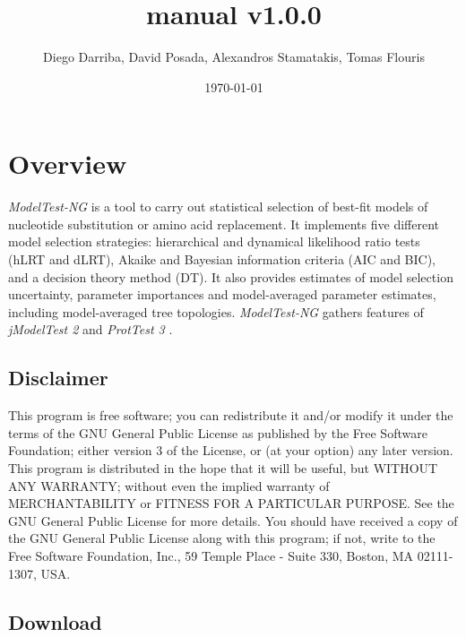 \documentclass[10pt,twoside,a4paper]{article}
\begin{document}
\providecommand{\versionnumber}{1.0.0}
\title{\normalsize manual v\versionnumber}
\author{Diego Darriba, David Posada, Alexandros Stamatakis, Tomas Flouris}
\date{\today}
\maketitle

\newcommand{\modeltest}{\emph{ModelTest-NG} }
\newcommand{\modeltestbin}{\emph{modeltest-ng} }
\newcommand{\modeltestguibin}{\emph{modeltest-gui} }

\setcounter{tocdepth}{2}
\tableofcontents

\clearpage

\section{Overview}

{\modeltest} is a tool to carry out statistical selection of best-fit models of nucleotide substitution or amino acid replacement.
It implements five different model selection strategies: hierarchical and dynamical likelihood ratio tests (hLRT and dLRT), Akaike and Bayesian information criteria (AIC and BIC), and a decision theory method (DT).
It also provides estimates of model selection uncertainty, parameter importances and model-averaged parameter estimates, including model-averaged tree topologies.
{\modeltest} gathers features of {\em jModelTest 2} \citep{Darriba2013} and {\em ProtTest 3} \citep{Darriba2011}.

\subsection{Disclaimer}

{\footnotesize
This program is free software; you can redistribute it and/or modify it under the terms of the GNU General Public License as published by the Free Software Foundation;
either version 3 of the License, or (at your option) any later version. This program is distributed in the hope that it will be useful, but WITHOUT ANY WARRANTY;
without even the implied warranty of MERCHANTABILITY or FITNESS FOR A PARTICULAR PURPOSE. See the GNU General Public License for more details.
You should have received a copy of the GNU General Public License along with this program; if not, write to the Free Software Foundation, Inc., 59 Temple Place - Suite 330, Boston, MA 02111-1307, USA.
}

\subsection{Download}
\end{document}
